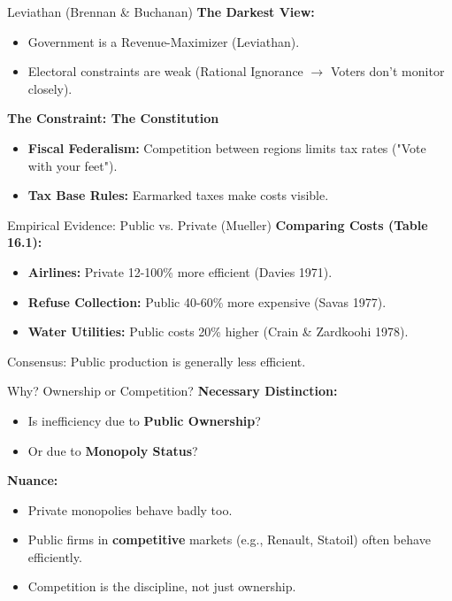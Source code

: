 \documentclass[10pt]{beamer}
\begin{document}
\begin{frame}{Leviathan (Brennan \& Buchanan)}
\textbf{The Darkest View:}
\begin{itemize}
\item Government is a Revenue-Maximizer (Leviathan).
\item Electoral constraints are weak (Rational Ignorance $\rightarrow$ Voters don’t monitor closely).
\end{itemize}

\textbf{The Constraint: The Constitution}
\begin{itemize}
\item \textbf{Fiscal Federalism:} Competition between regions limits tax rates ("Vote with your feet").
\item \textbf{Tax Base Rules:} Earmarked taxes make costs visible.
\end{itemize}
\end{frame}

\begin{frame}{Empirical Evidence: Public vs. Private (Mueller)}
\textbf{Comparing Costs (Table 16.1):}
\begin{itemize}
\item \textbf{Airlines:} Private 12-100\% more efficient (Davies 1971).
\item \textbf{Refuse Collection:} Public 40-60\% more expensive (Savas 1977).
\item \textbf{Water Utilities:} Public costs 20\% higher (Crain \& Zardkoohi 1978).
\end{itemize}

\alert{Consensus:} Public production is generally less efficient.
\end{frame}

\begin{frame}{Why? Ownership or Competition?}
\textbf{Necessary Distinction:}
\begin{itemize}
\item Is inefficiency due to \textbf{Public Ownership}?
\item Or due to \textbf{Monopoly Status}?
\end{itemize}

\textbf{Nuance:}
\begin{itemize}
\item Private monopolies behave badly too.
\item Public firms in \textbf{competitive} markets (e.g., Renault, Statoil) often behave efficiently.
\item \alert{Competition is the discipline, not just ownership}.
\end{itemize}
\end{frame}
\end{document}
